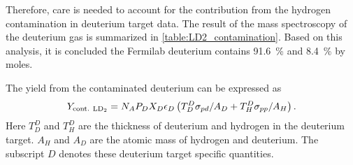 \documentclass[../main.tex]{subfiles}
\begin{document}
Therefore, care is needed to account for the contribution from the hydrogen contamination in deuterium
target data. The result of the mass spectroscopy of the deuterium gas \cite{don-4993} is
summarized in \cref{table:LD2_contamination}. Based on this analysis, it is concluded the Fermilab
deuterium contains \SI{91.6}{\percent}  and \SI{8.4}{\percent}  by moles. 

The yield from the contaminated deuterium can be expressed as
\begin{equation}
	Y_{\mathrm{cont.~\ce{LD_2}}} = N_A P_D X_D \epsilon_D \left( T_D^D \sigma_{pd}/A_D + T^D_H \sigma_{pp}/A_H   \right).
\end{equation}
Here $T_D^D$ and $T^D_H$ are the thickness of deuterium and hydrogen in the deuterium target.
$A_H$ and $A_D$ are the atomic mass of hydrogen and deuterium.
The subscript $D$ denotes these deuterium target specific quantities.
\end{document}
